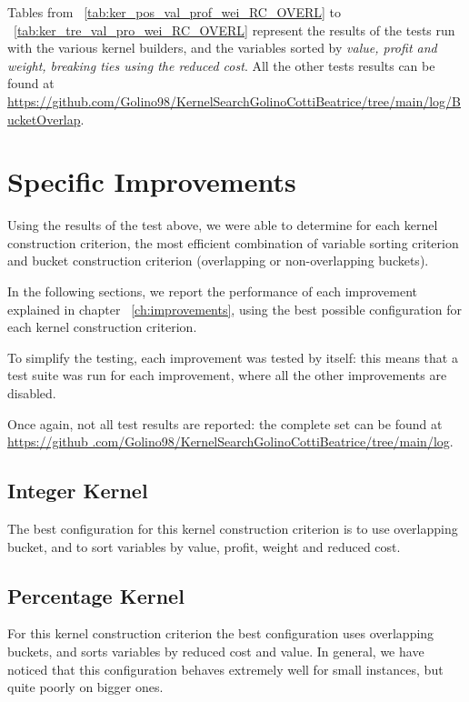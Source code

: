 Tables from ~\ref{tab:ker_pos_val_prof_wei_RC_OVERL} to ~\ref{tab:ker_tre_val_pro_wei_RC_OVERL}
represent the results of the tests run with the various kernel builders,
and the variables sorted by \textit{value, profit and weight, breaking ties using the reduced cost}.
All the other tests results can be found at
\url{https://github.com/Golino98/KernelSearchGolinoCottiBeatrice/tree/main/log/BucketOverlap}.







\section{Specific Improvements}
Using the results of the test above, we were able to determine
for each kernel construction criterion, the most efficient combination of variable sorting criterion and bucket
construction criterion (overlapping or non-overlapping buckets).

In the following sections, we report the performance
of each improvement explained in chapter ~\ref{ch:improvements},
using the best possible configuration for each kernel construction criterion.

To simplify the testing, each improvement was tested by itself: this means that a test suite was run for each
improvement, where all the other improvements are disabled.

Once again, not all test results are reported: the complete set can be found at \url{https://github
.com/Golino98/KernelSearchGolinoCottiBeatrice/tree/main/log}.

\subsection{Integer Kernel}
The best configuration for this kernel construction criterion is to use overlapping bucket,
and to sort variables by value, profit, weight and reduced cost.

\subsection{Percentage Kernel}
For this kernel construction criterion the best configuration uses overlapping buckets,
and sorts variables by reduced cost and value.
In general, we have noticed that this configuration behaves extremely well for small instances, but quite poorly on
bigger ones.


